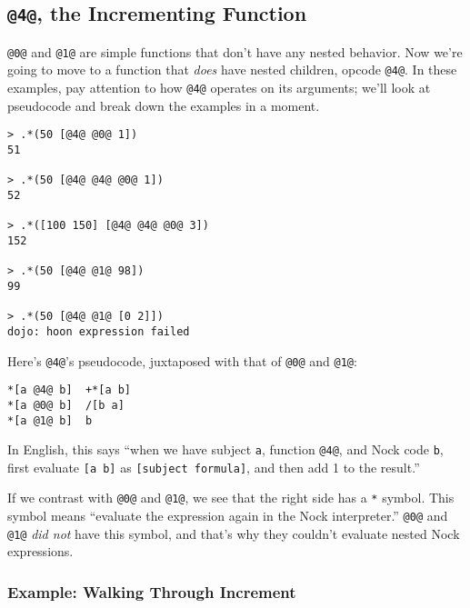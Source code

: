 \documentclass[twoside]{article}
\begin{document}
\subsection{\lstinline[style=inlinecode]{@4@}, the Incrementing Function}
\label{sxn:nock4}

\lstinline[style=inlinecode]{@0@} and \lstinline[style=inlinecode]{@1@} are simple functions that don't have any nested behavior. Now we're going to move to a function that \emph{does} have nested children, opcode \lstinline[style=inlinecode]{@4@}.  In these examples, pay attention to how \lstinline[style=inlinecode]{@4@} operates on its arguments; we'll look at pseudocode and break down the examples in a moment.

\begin{lstlisting}[style=listingcode]
> .*(50 [@4@ @0@ 1])
51

> .*(50 [@4@ @4@ @0@ 1])
52

> .*([100 150] [@4@ @4@ @0@ 3])
152

> .*(50 [@4@ @1@ 98])
99

> .*(50 [@4@ @1@ [0 2]])
dojo: hoon expression failed
\end{lstlisting}

Here's \lstinline[style=inlinecode]{@4@}'s pseudocode, juxtaposed with that of \lstinline[style=inlinecode]{@0@} and \lstinline[style=inlinecode]{@1@}:

\begin{lstlisting}[style=listingcode]
*[a @4@ b]  +*[a b]
*[a @0@ b]  /[b a]
*[a @1@ b]  b
\end{lstlisting}

In English, this says “when we have subject \lstinline[style=inlinecode]{a}, function \lstinline[style=inlinecode]{@4@}, and Nock code \lstinline[style=inlinecode]{b}, first evaluate \lstinline[style=inlinecode]{[a b]} as \lstinline[style=inlinecode]{[subject formula]}, and then add 1 to the result.”

If we contrast with \lstinline[style=inlinecode]{@0@} and \lstinline[style=inlinecode]{@1@}, we see that the right side has a \lstinline[style=inlinecode]{*} symbol. This symbol means “evaluate the expression again in the Nock interpreter.” \lstinline[style=inlinecode]{@0@} and \lstinline[style=inlinecode]{@1@} \emph{did not} have this symbol, and that's why they couldn't evaluate nested Nock expressions.

\subsubsection{Example:  Walking Through Increment}
\end{document}
